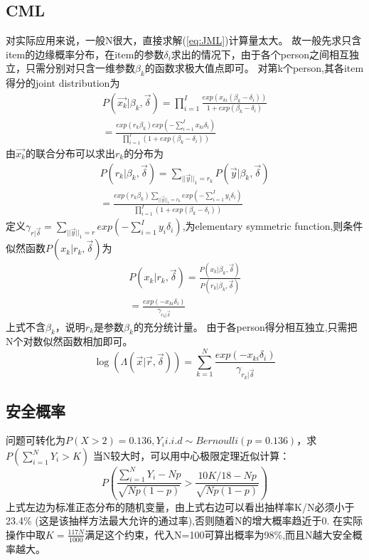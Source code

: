 \documentclass[12pt]{article}
\begin{document}
\subsection{CML}
对实际应用来说，一般N很大，直接求解(\ref{eq:JML})计算量太大。
故一般先求只含item的边缘概率分布，在item的参数$\delta_i$求出的情况下，由于各个person之间相互独立，只需分别对只含一维参数$\beta_k$的函数求极大值点即可。
对第k个person,其各item得分的joint distribution为
\begin{equation}
\begin{split}
P(\vec{x_k}|\beta_k,\vec{\delta})=\prod_{i=1}^I \frac{exp(x_{ki}(\beta_k-\delta_i))}{1+exp(\beta_k-\delta_i)}\\
=\frac{exp(r_k\beta_k)exp(-\sum_{i=1}^I x_{ki}\delta_i)}{\prod_{i=1}^I (1+exp(\beta_k-\delta_i))}
\end{split}
\end{equation}
由$\vec{x_k}$的联合分布可以求出$r_k$的分布为
\begin{equation}
\begin{split}
P(r_k|\beta_k,\vec{\delta})=\sum_{||\vec{y}||_1=r_k}P(\vec{y}|\beta_k,\vec{\delta})\\
=\frac{exp(r_k\beta_k)\displaystyle\sum_{||\vec{y}||_1=r_k}exp(-\sum_{i=1}^I y_{i}\delta_i)}{\prod_{i=1}^I (1+exp(\beta_k-\delta_i))}
\end{split}
\end{equation}
定义$\gamma_{r|\vec{\delta}}=\displaystyle\sum_{||\vec{y}||_1=r}exp(-\sum_{i=1}^I y_{i}\delta_i)$,为elementary symmetric function,则条件似然函数$P(x_k|r_k,\vec{\delta})$为
\begin{equation}
\begin{split}
P(x_k|r_k,\vec{\delta})=\frac{P(x_k|\beta_k,\vec{\delta})}{P(r_k|\beta_k,\vec{\delta})}\\
=\frac{exp(-x_{ki}\delta_i)}{\gamma_{r_k|\vec{\delta}}}
\end{split}
\end{equation}
上式不含$\beta_k$，说明$r_k$是参数$\beta_k$的充分统计量。
由于各person得分相互独立,只需把N个对数似然函数相加即可。
\begin{equation}
\log(\Lambda(\vec{x}|\vec{r},\vec{\delta}))=\sum_{k=1}^N \frac{exp(-x_{ki}\delta_i)}{\gamma_{r_k|\vec{\delta}}}
\end{equation}
\subsection{安全概率}\label{A2}
问题可转化为$P(X>2)=0.136,Y_i i.i.d \sim Bernoulli(p=0.136)$，求$P(\displaystyle\sum_{i=1}^N Y_i >K)$
当N较大时，可以用中心极限定理近似计算：
\begin{equation}
P(\frac{\sum_{i=1}^N Y_i-Np}{\sqrt{Np(1-p)}}>\frac{10K/18-Np}{\sqrt{Np(1-p)}})
\end{equation}
上式左边为标准正态分布的随机变量，由上式右边可以看出抽样率K/N必须小于23.4\% (这是该抽样方法最大允许的通过率),否则随着N的增大概率趋近于0.
在实际操作中取$K=\frac{117N}{1000}$满足这个约束，代入N=100可算出概率为98\%,而且N越大安全概率越大。
\end{document}
